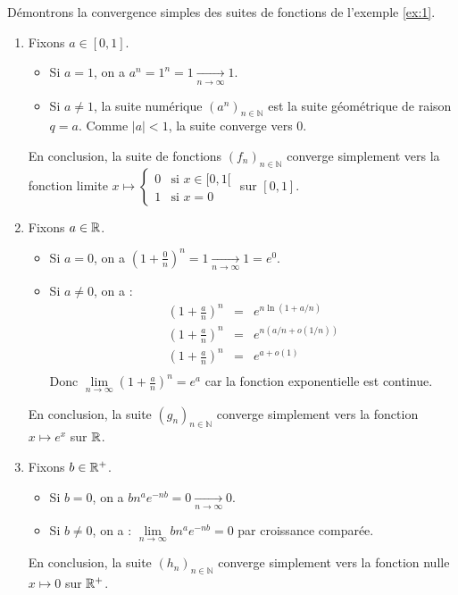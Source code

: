 \documentclass{book}
\begin{document}
\begin{Exemple}
Démontrons la convergence simples des suites de fonctions de l'exemple \ref{ex:1}.
\begin{enumerate}
\item 
Fixons $a\in [0,1]$.\\
\begin{itemize}
\item Si $a=1$, on a $a^n=1^n=1\xrightarrow[{n\to \infty}]{} 1$.
\item Si $a\neq 1$, la suite numérique $(a^n)_{n\in \mathbb{N}}$ est la suite géométrique de raison $q=a$. Comme $|a|<1$, la suite   converge vers 0. 
\end{itemize}
En conclusion, la suite de fonctions $(f_n)_{n\in \mathbb{N}}$ converge simplement vers la fonction limite $x \mapsto \begin{cases}0&{\text{si }}x\in[0,1[\\1&{\text{si } x=0}\end{cases} $ sur $[0,1]$.
\item 
Fixons $a\in \mathbb{R} $.
\begin{itemize}
\item Si $a=0$, on a $(1+\frac 0 n)^n=1\xrightarrow[{n\to \infty}]{} 1=e^0$.
\item Si $a\neq0$, on a :
$$
\begin{array}{rcl}
(1+\frac a n)^n &=& e^{n\ln (1+a/n)}\\
(1+\frac a n)^n &=& e^{n (a/n+o(1/n))}\\
(1+\frac a n)^n &=& e^{a+o(1)}\\
\end{array}
$$
Donc $\lim\limits_{n \to \infty}(1+\frac a n)^n=e^a$ car la fonction exponentielle est continue. 
\end{itemize}
En conclusion, la suite $(g_n)_{n\in \mathbb{N}}$ converge simplement vers la fonction $x \mapsto e^{x}$ sur $\mathbb{R} $.
\item 
Fixons $b\in \mathbb{R} ^+$.
\begin{itemize}
\item  Si $b=0$, on a $b n^a e^{-nb}=0\xrightarrow[{n\to \infty}]{} 0$.
\item Si $b\neq 0$, on a : $\lim\limits_{n \to \infty}b n^a e^{-nb}=0$ par croissance comparée.
\end{itemize}
En conclusion,  la suite $(h_n)_{n\in \mathbb{N}}$ converge simplement vers la fonction nulle $x \mapsto 0$ sur $\mathbb{R} ^+$.
\end{enumerate}
\end{Exemple}
\end{document}
